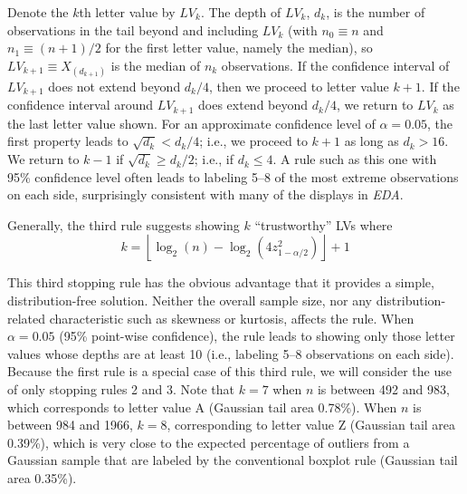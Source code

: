 \documentclass[oneside]{article}
\begin{document}
Denote the $k$th letter value by $LV_k$. 
The depth of $LV_k$, $d_k$, is the number of observations in the tail beyond
and including $LV_{k}$ (with $n_0 \equiv n$ and $n_1 \equiv (n+1)/2$ for the
first letter value, namely the median), 
so $LV_{k+1} \equiv X_{(d_{k+1})}$ is the median
of $n_k$ observations.
If the confidence interval of $LV_{k+1}$ does not extend beyond 
$d_k/4$, then we proceed to letter value $k+1$. 
If the confidence interval around $LV_{k+1}$ does extend beyond $d_k/4$, 
we return to $LV_{k}$ as the last letter value shown.
For an approximate confidence level of $\alpha= 0.05$, the first property 
leads to $\sqrt{d_k} < d_k/4$; i.e., we proceed to $k+1$ as long as 
$d_k > 16$. 
We return to $k-1$ if  $\sqrt{d_k} \ge d_k/2$; i.e., if $d_k \le 4$. 
A rule such as this one with 95\% confidence level often leads to
labeling 5--8 of the most extreme observations on each side,
surprisingly consistent with many of the displays in \textit{EDA}.

Generally, the third rule suggests showing $k$  ``trustworthy'' LVs where
\begin{equation}
k =  \left \lfloor \log_2 (n) - \log_2 
   \left(4  z_{1-\alpha/2}^2 \right) \right \rfloor + 1
\end{equation}

This third stopping rule has the obvious advantage that it provides a 
simple, distribution-free solution. Neither the overall sample size,
nor any distribution-related characteristic such as skewness or 
kurtosis, affects the rule.
When $\alpha = 0.05$ (95\% point-wise confidence), the rule
leads to showing only those letter values whose depths are
at least 10 (i.e., labeling 5--8 observations on each side).
Because the first rule is a special case of this third rule,
we will consider the use of only stopping rules 2 and 3.
Note that $k = 7$ when $n$ is
between 492 and 983, which corresponds to letter value A
(Gaussian tail area 0.78\%).  When $n$ is between 984 and 1966, 
$k = 8$, corresponding to letter value Z (Gaussian tail area 0.39\%),
which is very close to the expected percentage of outliers 
from a Gaussian sample that are labeled by the conventional
boxplot rule (Gaussian tail area 0.35\%).
\end{document}
